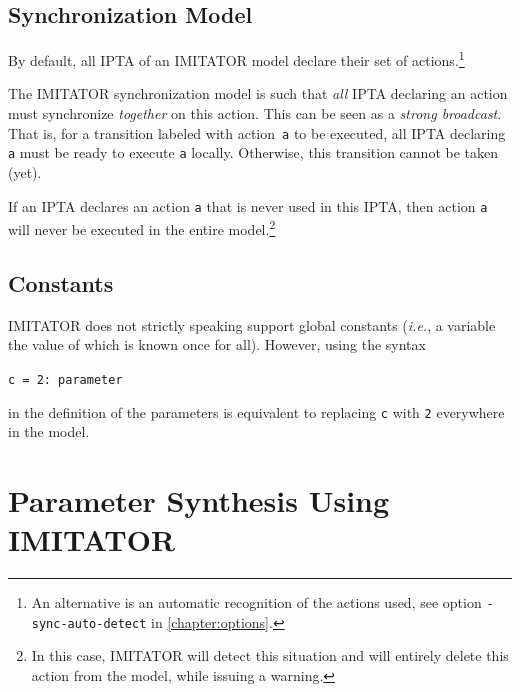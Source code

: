 \documentclass[a4paper,11pt]{report}
\newcommand{\imitator}{\textsf{IMITATOR}}
\newcommand{\IPTA}{IPTA}
\newcommand{\styleIMI}[1]{\textcolor{imicolor}{\texttt{#1}}}
\newcommand{\styleOption}[1]{\textcolor{optioncolor}{\texttt{#1}}}
\newcommand{\ie}{\textcolor{colorok}{\textit{i.e.}, }}
\begin{document}
\section{Synchronization Model}

By default, all \IPTA{} of an \imitator{} model declare their set of actions.\footnote{%
	An alternative is an automatic recognition of the actions used, see option \styleOption{-sync-auto-detect} in \cref{chapter:options}.
}

The \imitator{} synchronization model is such that \emph{all} \IPTA{} declaring an action must synchronize \emph{together} on this action.
This can be seen as a \emph{strong broadcast}.
That is, for a transition labeled with action~\styleIMI{a} to be executed, all \IPTA{} declaring \styleIMI{a} must be ready to execute \styleIMI{a} locally.
Otherwise, this transition cannot be taken (yet).

If an \IPTA{} declares an action \styleIMI{a} that is never used in this \IPTA{}, then action \styleIMI{a} will never be executed in the entire model.\footnote{%
	In this case, \imitator{} will detect this situation and will entirely delete this action from the model, while issuing a warning.
}

\section{Constants}

\imitator{} does not strictly speaking support global constants (\ie{} a variable the value of which is known once for all).
However, using the syntax
% 
\begin{center}
\styleIMI{c = 2: parameter}
\end{center}
% 
in the definition of the parameters is equivalent to replacing \styleIMI{c} with \styleIMI{2} everywhere in the model.




\chapter{Parameter Synthesis Using IMITATOR}
\end{document}
